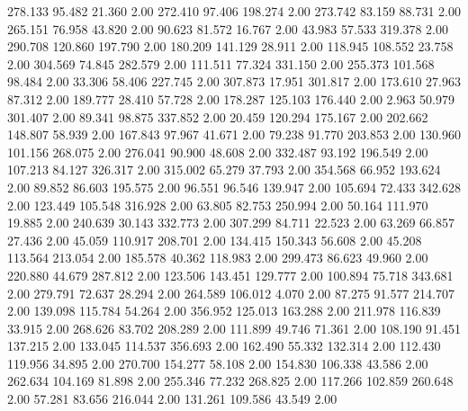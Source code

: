  278.133   95.482   21.360         2.00
 272.410   97.406  198.274         2.00
 273.742   83.159   88.731         2.00
 265.151   76.958   43.820         2.00
  90.623   81.572   16.767         2.00
  43.983   57.533  319.378         2.00
 290.708  120.860  197.790         2.00
 180.209  141.129   28.911         2.00
 118.945  108.552   23.758         2.00
 304.569   74.845  282.579         2.00
 111.511   77.324  331.150         2.00
 255.373  101.568   98.484         2.00
  33.306   58.406  227.745         2.00
 307.873   17.951  301.817         2.00
 173.610   27.963   87.312         2.00
 189.777   28.410   57.728         2.00
 178.287  125.103  176.440         2.00
   2.963   50.979  301.407         2.00
  89.341   98.875  337.852         2.00
  20.459  120.294  175.167         2.00
 202.662  148.807   58.939         2.00
 167.843   97.967   41.671         2.00
  79.238   91.770  203.853         2.00
 130.960  101.156  268.075         2.00
 276.041   90.900   48.608         2.00
 332.487   93.192  196.549         2.00
 107.213   84.127  326.317         2.00
 315.002   65.279   37.793         2.00
 354.568   66.952  193.624         2.00
  89.852   86.603  195.575         2.00
  96.551   96.546  139.947         2.00
 105.694   72.433  342.628         2.00
 123.449  105.548  316.928         2.00
  63.805   82.753  250.994         2.00
  50.164  111.970   19.885         2.00
 240.639   30.143  332.773         2.00
 307.299   84.711   22.523         2.00
  63.269   66.857   27.436         2.00
  45.059  110.917  208.701         2.00
 134.415  150.343   56.608         2.00
  45.208  113.564  213.054         2.00
 185.578   40.362  118.983         2.00
 299.473   86.623   49.960         2.00
 220.880   44.679  287.812         2.00
 123.506  143.451  129.777         2.00
 100.894   75.718  343.681         2.00
 279.791   72.637   28.294         2.00
 264.589  106.012    4.070         2.00
  87.275   91.577  214.707         2.00
 139.098  115.784   54.264         2.00
 356.952  125.013  163.288         2.00
 211.978  116.839   33.915         2.00
 268.626   83.702  208.289         2.00
 111.899   49.746   71.361         2.00
 108.190   91.451  137.215         2.00
 133.045  114.537  356.693         2.00
 162.490   55.332  132.314         2.00
 112.430  119.956   34.895         2.00
 270.700  154.277   58.108         2.00
 154.830  106.338   43.586         2.00
 262.634  104.169   81.898         2.00
 255.346   77.232  268.825         2.00
 117.266  102.859  260.648         2.00
  57.281   83.656  216.044         2.00
 131.261  109.586   43.549         2.00

